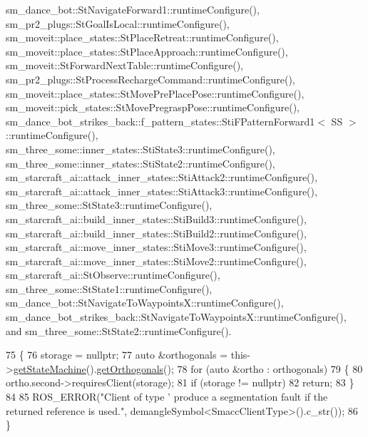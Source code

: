 sm\+\_\+dance\+\_\+bot\+::\+St\+Navigate\+Forward1\+::runtime\+Configure(), sm\+\_\+pr2\+\_\+plugs\+::\+St\+Goal\+Is\+Local\+::runtime\+Configure(), sm\+\_\+moveit\+::place\+\_\+states\+::\+St\+Place\+Retreat\+::runtime\+Configure(), sm\+\_\+moveit\+::place\+\_\+states\+::\+St\+Place\+Approach\+::runtime\+Configure(), sm\+\_\+moveit\+::\+St\+Forward\+Next\+Table\+::runtime\+Configure(), sm\+\_\+pr2\+\_\+plugs\+::\+St\+Process\+Recharge\+Command\+::runtime\+Configure(), sm\+\_\+moveit\+::place\+\_\+states\+::\+St\+Move\+Pre\+Place\+Pose\+::runtime\+Configure(), sm\+\_\+moveit\+::pick\+\_\+states\+::\+St\+Move\+Pregrasp\+Pose\+::runtime\+Configure(), sm\+\_\+dance\+\_\+bot\+\_\+strikes\+\_\+back\+::f\+\_\+pattern\+\_\+states\+::\+Sti\+F\+Pattern\+Forward1$<$ S\+S $>$\+::runtime\+Configure(), sm\+\_\+three\+\_\+some\+::inner\+\_\+states\+::\+Sti\+State3\+::runtime\+Configure(), sm\+\_\+three\+\_\+some\+::inner\+\_\+states\+::\+Sti\+State2\+::runtime\+Configure(), sm\+\_\+starcraft\+\_\+ai\+::attack\+\_\+inner\+\_\+states\+::\+Sti\+Attack2\+::runtime\+Configure(), sm\+\_\+starcraft\+\_\+ai\+::attack\+\_\+inner\+\_\+states\+::\+Sti\+Attack3\+::runtime\+Configure(), sm\+\_\+three\+\_\+some\+::\+St\+State3\+::runtime\+Configure(), sm\+\_\+starcraft\+\_\+ai\+::build\+\_\+inner\+\_\+states\+::\+Sti\+Build3\+::runtime\+Configure(), sm\+\_\+starcraft\+\_\+ai\+::build\+\_\+inner\+\_\+states\+::\+Sti\+Build2\+::runtime\+Configure(), sm\+\_\+starcraft\+\_\+ai\+::move\+\_\+inner\+\_\+states\+::\+Sti\+Move3\+::runtime\+Configure(), sm\+\_\+starcraft\+\_\+ai\+::move\+\_\+inner\+\_\+states\+::\+Sti\+Move2\+::runtime\+Configure(), sm\+\_\+starcraft\+\_\+ai\+::\+St\+Observe\+::runtime\+Configure(), sm\+\_\+three\+\_\+some\+::\+St\+State1\+::runtime\+Configure(), sm\+\_\+dance\+\_\+bot\+::\+St\+Navigate\+To\+Waypoints\+X\+::runtime\+Configure(), sm\+\_\+dance\+\_\+bot\+\_\+strikes\+\_\+back\+::\+St\+Navigate\+To\+Waypoints\+X\+::runtime\+Configure(), and sm\+\_\+three\+\_\+some\+::\+St\+State2\+::runtime\+Configure().


\begin{DoxyCode}
75 \{
76     storage = \textcolor{keyword}{nullptr};
77     \textcolor{keyword}{auto} &orthogonals = this->\hyperlink{classsmacc_1_1ISmaccState_a562bb3f9a3ac16b8be71e4794c9e7523}{getStateMachine}().\hyperlink{classsmacc_1_1ISmaccStateMachine_a5b4dcb0a5135296cf3d728721ecd8053}{getOrthogonals}();
78     \textcolor{keywordflow}{for} (\textcolor{keyword}{auto} &ortho : orthogonals)
79     \{
80         ortho.second->requiresClient(storage);
81         \textcolor{keywordflow}{if} (storage != \textcolor{keyword}{nullptr})
82             \textcolor{keywordflow}{return};
83     \}
84 
85     ROS\_ERROR(\textcolor{stringliteral}{"Client of type '%
       produce a segmentation fault if the returned reference is used."}, demangleSymbol<SmaccClientType>().c\_str());
86 \}
\end{DoxyCode}



